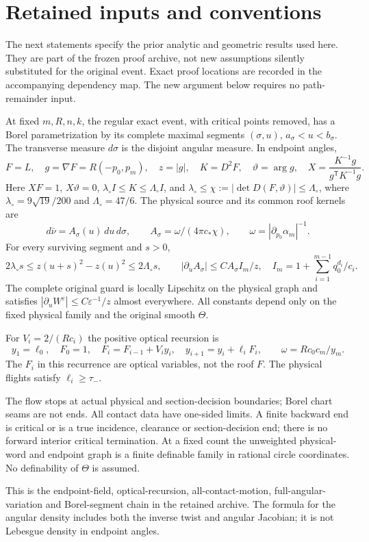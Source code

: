 \section{Retained inputs and conventions}
The next statements specify the prior analytic and geometric results
used here. They are part of the frozen proof archive, not new
assumptions silently substituted for the original event. Exact proof
locations are recorded in the accompanying dependency map. The new
argument below requires no path-remainder input.

\begin{inputstatement}
\label{input:v93-geometry}
At fixed $m,R,n,k$, the regular exact event, with critical points
removed, has a Borel parametrization by its complete maximal segments
$(\sigma,u)$, $a_\sigma<u<b_\sigma$. The transverse measure $d\sigma$
is the disjoint angular measure. In endpoint angles,
\[
 F=L,\quad g=\nabla F=R(-p_0,p_m),\quad z=|g|,\quad
 K=D^2F,\quad \vartheta=\arg g,\quad
 X=\frac{K^{-1}g}{g^{\mathsf T}K^{-1}g}.
\]
Here $XF=1$, $X\vartheta=0$,
$\lambda_\circ I\le K\le\Lambda_\circ I$, and
$\lambda_\circ\le\chi:=|\det D(F,\vartheta)|\le\Lambda_\circ$,
where $\lambda_\circ=9\sqrt{19}/200$ and $\Lambda_\circ=47/6$.
The physical source and its common roof kernels are
\begin{equation}\label{eq:v93-area-input}
 d\bar\nu=A_\sigma(u)\,du\,d\sigma,
 \qquad A_\sigma=\omega/(4\pi c_*\chi),\qquad
 \omega=|\partial_{p_0}\alpha_m|^{-1}.
\end{equation}
For every surviving segment and $s>0$,
\[
 2\lambda_\circ s\le z(u+s)^2-z(u)^2\le2\Lambda_\circ s,
 \qquad |\partial_u A_\sigma|\le C A_\sigma I_m/z,
 \quad I_m=1+\sum_{i=1}^{m-1}q_0^{d_i}/c_i.
\]
The complete original guard is locally Lipschitz on the physical graph
and satisfies $|\partial_uW^\varepsilon|\le C\varepsilon^{-1}/z$
almost everywhere. All constants depend only on the fixed physical
family and the original smooth $\Theta$.

For $V_i=2/(Rc_i)$ the positive optical recursion is
\begin{equation}\label{eq:v93-recursion-input}
 y_1=\ell_0,\quad F_0=1,\quad
 F_i=F_{i-1}+V_i y_i,\quad y_{i+1}=y_i+\ell_iF_i,
 \qquad \omega=Rc_0c_m/y_m.
\end{equation}
The $F_i$ in this recurrence are optical variables, not the roof $F$.
The physical flights satisfy $\ell_i\ge\tau_-$.

The flow stops at actual physical and section-decision boundaries;
Borel chart seams are not ends. All contact data have one-sided
limits. A finite backward end is critical or is a true incidence,
clearance or section-decision end; there is no forward interior
critical termination. At a fixed count the unweighted physical-word
and endpoint graph is a finite definable family in rational circle
coordinates. No definability of $\Theta$ is assumed.
\end{inputstatement}
This is the endpoint-field, optical-recursion, all-contact-motion,
full-angular-variation and Borel-segment chain in the retained archive.
The formula for the angular density includes both the inverse twist
and angular Jacobian; it is not Lebesgue density in endpoint angles.

